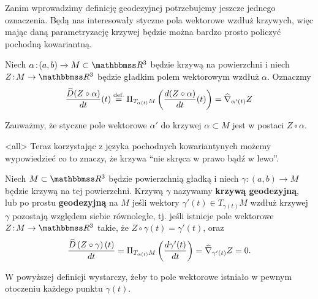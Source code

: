 Zanim wprowadzimy definicję geodezyjnej potrzebujemy jeszcze jednego oznaczenia. Będą nas interesowały styczne pola wektorowe wzdłuż krzywych, więc mając daną parametryzację krzywej będzie można bardzo prosto policzyć pochodną kowariantną. 
\begin{frame}


Niech $\alpha\colon (a,b)\to M\subset\R^3$ będzie krzywą na powierzchni i niech $Z\colon M\to \R^3$ będzie gładkim polem wektorowym wzdłuż $\alpha$. Oznaczmy 
\[\frac{\widehat{D}(Z\circ \alpha)}{dt}(t)\define\Pi_{T_{\alpha(t)}M}\left(\frac{d (Z\circ \alpha)}{dt}(t)\right)=\widehat{\nabla}_{\alpha'(t)}Z\]


\pause \begin{uwaga}

Zauważmy, że styczne pole wektorowe $\alpha'$ do krzywej $\alpha\subset M$ jest w postaci $Z\circ \alpha$. %
\end{uwaga}
\end{frame}
\mode<all>{}
Teraz korzystając z języka pochodnych kowariantynych możemy wypowiedzieć co to znaczy, że krzywa ``nie skręca w prawo bądź w lewo''. 
\begin{frame}

\begin{definicja}
Niech $M\subset \R^3$ będzie powierzchnią gładką i niech $\gamma\colon (a,b)\to M$ będzie krzywą na tej powierzchni. Krzywą $\gamma$ nazywamy \textbf{krzywą geodezyjną}, lub po prostu \textbf{geodezyjną} na $M$ jeśli wektory $\gamma'(t)\in T_{\gamma(t)}M$ wzdłuż krzywej $\gamma$ pozostają względem siebie równoległe\pause, tj. jeśli istnieje pole wektorowe $Z\colon M\to \R^3$ takie, że $Z\circ \gamma(t)=\gamma'(t)$, oraz \[\frac{\widehat{D}\left(Z\circ\gamma\right)(t)}{dt}=\Pi_{T_{\alpha(t)}M}\left(\frac{d \gamma'(t)}{dt}\right)= \widehat{\nabla}_{\gamma'(t)}Z=0.\]
\end{definicja}

\pause\begin{uwaga}
W powyższej definicji wystarczy, żeby to pole wektorowe istniało w pewnym otoczeniu każdego punktu $\gamma(t)$.
\end{uwaga}

\end{frame}
